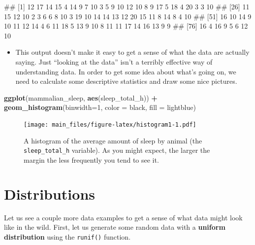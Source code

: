 \documentclass[
]{book}
\newenvironment{Shaded}{\begin{snugshade}}{\end{snugshade}}
\newcommand{\AttributeTok}[1]{\textcolor[rgb]{0.13,0.29,0.53}{#1}}
\newcommand{\DecValTok}[1]{\textcolor[rgb]{0.00,0.00,0.81}{#1}}
\newcommand{\FunctionTok}[1]{\textcolor[rgb]{0.13,0.29,0.53}{\textbf{#1}}}
\newcommand{\NormalTok}[1]{#1}
\newcommand{\SpecialCharTok}[1]{\textcolor[rgb]{0.81,0.36,0.00}{\textbf{#1}}}
\newcommand{\StringTok}[1]{\textcolor[rgb]{0.31,0.60,0.02}{#1}}
\providecommand{\tightlist}{%
  \setlength{\itemsep}{0pt}\setlength{\parskip}{0pt}}
\begin{document}
\begin{Shaded}
\begin{Highlighting}[]
\NormalTok{\#\#  [1] 12 17 14 15  4 14  9  7 10  3  5  9 10 12 10  8  9 17  5 18  4 20  3  3 10}
\NormalTok{\#\# [26] 11 15 12 10  2  3  6  6  8 10  3 19 10 14 14 13 12 20 15 11  8 14  8  4 10}
\NormalTok{\#\# [51] 16 10 14  9 10 11 12 14  4  6 11 18  5 13  9 10  8 11 11 17 14 16 13  9  9}
\NormalTok{\#\# [76] 16  4 16  9  5  6 12 10}
\end{Highlighting}
\end{Shaded}

\begin{itemize}
\tightlist
\item
  This output doesn't make it easy to get a sense of what the data are actually saying. Just ``looking at the data'' isn't a terribly effective way of understanding data. In order to get some idea about what's going on, we need to calculate some descriptive statistics and draw some nice pictures.
\end{itemize}

\begin{Shaded}
\begin{Highlighting}[]
\FunctionTok{ggplot}\NormalTok{(mammalian\_sleep, }\FunctionTok{aes}\NormalTok{(sleep\_total\_h)) }\SpecialCharTok{+}
        \FunctionTok{geom\_histogram}\NormalTok{(}\AttributeTok{binwidth=}\DecValTok{1}\NormalTok{,}
                       \AttributeTok{color =} \StringTok{\textquotesingle{}black\textquotesingle{}}\NormalTok{,}
                       \AttributeTok{fill =} \StringTok{\textquotesingle{}lightblue\textquotesingle{}}\NormalTok{)}
\end{Highlighting}
\end{Shaded}

\begin{figure}
\centering
\texttt{[image: main\_files/figure-latex/histogram1-1.pdf]}
\caption{\label{fig:histogram1}A histogram of the average amount of sleep by animal (the \texttt{sleep\_total\_h} variable). As you might expect, the larger the margin the less frequently you tend to see it.}
\end{figure}

\section{Distributions}\label{distributions}

Let us see a couple more data examples to get a sense of what data might look like in the wild. First, let us generate some random data with a \textbf{uniform distribution} using the \texttt{runif()} function.
\end{document}

